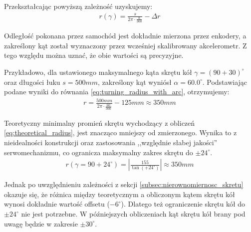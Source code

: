             Przekształcając powyższą zależność uzyskujemy:
            \begin{gather}
                r(\gamma) = \frac{s}{2\pi \cdot \frac{\alpha}{360}} - \Delta r
                \label{eq:turning_radius_with_arc}
            \end{gather}

            Odległość pokonana przez samochód jest dokładnie mierzona przez enkodery, a zakreślony kąt został wyznaczony przez wcześniej skalibrowany akcelerometr.
            Z tego względu można uznać, że obie wartości są precyzyjne.

            Przykładowo, dla ustawionego maksymalnego kąta skrętu kół $\gamma = (90 + 30)^\circ$ oraz długości łuku $s = 500mm$, zakreślony kąt wyniósł $\alpha = 60.0^\circ$.
            Podstawiając podane wyniki do równania \eqref{eq:turning_radius_with_arc}, otrzymujemy:
            \begin{gather}
                r = \frac{500mm}{2\pi \cdot \frac{60}{360}} - 125mm \approx 350mm
            \end{gather}


            Teoretyczny minimalny promień skrętu wychodzący z obliczeń \eqref{eq:theoretical_radius}, jest znacząco mniejszy od zmierzonego.
            Wynika to z nieidealności konstrukcji oraz zastosowania ,,względnie słabej jakości'' serwomechanizmu,
            co ogranicza maksymalny zakres skrętu do $\pm 24^\circ$.
            \begin{gather}
                r(\gamma = 90 + 24^\circ) = \left|\frac{155}{\tan(+ 24^\circ)}\right| \approx 350mm
            \end{gather}

            Jednak po uwzględnieniu zależności z sekcji \ref{subsec:nierownomiernosc_skretu} okazuje się, że różnica między teoretycznym a obliczonym kątem skrętu kół wynosi dokładnie wartość offsetu ($-6^\circ$).
            Dlatego też ograniczenie skrętu kół do $\pm 24^\circ$ nie jest potrzebne.
            W późniejszych obliczeniach kąt skrętu kół brany pod uwagę będzie w zakresie $\pm 30^\circ$.


